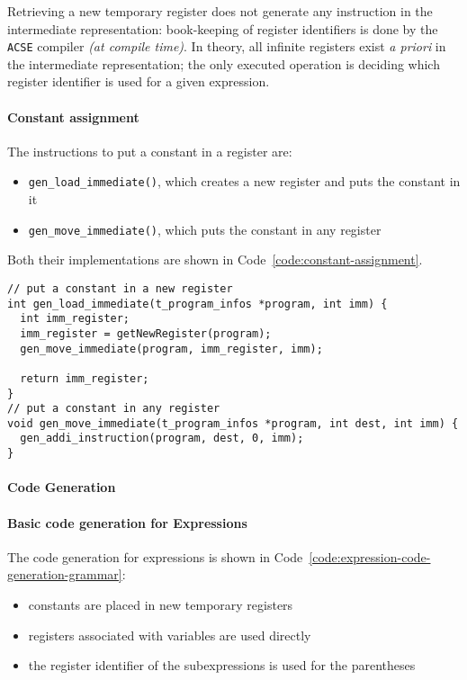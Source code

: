Retrieving a new temporary register does not generate any instruction in the intermediate representation:
book-keeping of register identifiers is done by the \texttt{ACSE} compiler \textit{(at compile time)}.
In theory, all infinite registers exist \textit{a priori} in the intermediate representation;
the only executed operation is deciding which register identifier is used for a given expression.

\paragraph{Constant assignment}

The instructions to put a constant in a register are:

\begin{itemize}[label=\textbf{\texttt{>}}]
  \item \texttt{gen\_load\_immediate()}, which creates a new register and puts the constant in it
  \item \texttt{gen\_move\_immediate()}, which puts the constant in any register
\end{itemize}

Both their implementations are shown in Code~\ref{code:constant-assignment}.

\begin{onepage}
  \begin{lstlisting}[language=LANCE, caption={Constant assignment}, label={code:constant-assignment}]
// put a constant in a new register
int gen_load_immediate(t_program_infos *program, int imm) {
  int imm_register;
  imm_register = getNewRegister(program);
  gen_move_immediate(program, imm_register, imm);

  return imm_register;
}
// put a constant in any register
void gen_move_immediate(t_program_infos *program, int dest, int imm) {
  gen_addi_instruction(program, dest, 0, imm);
}
\end{lstlisting}
\end{onepage}

\paragraph{Code Generation}

\paragraph*{Basic code generation for Expressions}

The code generation for expressions is shown in Code~\ref{code:expression-code-generation-grammar}:
\begin{itemize}
  \item constants are placed in new temporary registers
  \item registers associated with variables are used directly
  \item the register identifier of the subexpressions is used for the parentheses
\end{itemize}

